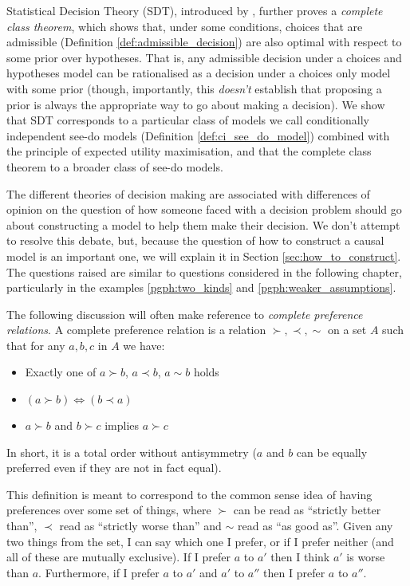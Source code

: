 Statistical Decision Theory (SDT), introduced by \citet{wald_statistical_1950}, further proves a \emph{complete class theorem}, which shows that, under some conditions, choices that are admissible (Definition \ref{def:admissible_decision}) are also optimal with respect to some prior over hypotheses. That is, any admissible decision under a choices and hypotheses model can be rationalised as a decision under a choices only model with some prior (though, importantly, this \emph{doesn't} establish that proposing a prior is always the appropriate way to go about making a decision). We show that SDT corresponds to a particular class of models we call conditionally independent see-do models (Definition \ref{def:ci_see_do_model}) combined with the principle of expected utility maximisation, and that the complete class theorem to a broader class of see-do models.

The different theories of decision making are associated with differences of opinion on the question of how someone faced with a decision problem should go about constructing a model to help them make their decision. We don't attempt to resolve this debate, but, because the question of how to construct a causal model is an important one, we will explain it in Section \ref{sec:how_to_construct}. The questions raised are similar to questions considered in the following chapter, particularly in the examples \ref{pgph:two_kinds} and \ref{pgph:weaker_assumptions}.

The following discussion will often make reference to \emph{complete preference relations}. A complete preference relation is a relation $\succ,\prec,\sim$ on a set $A$ such that for any $a,b,c$ in $A$ we have:
\begin{itemize}
    \item Exactly one of $a\succ b$, $a\prec b$, $a\sim b$ holds
    \item $(a\succ b)\iff(b\prec a)$
    \item $a\succ b$ and $b\succ c$ implies $a\succ c$
\end{itemize}
In short, it is a total order without antisymmetry ($a$ and $b$ can be equally preferred even if they are not in fact equal).

This definition is meant to correspond to the common sense idea of having preferences over some set of things, where $\succ$ can be read as ``strictly better than'', $\prec$ read as ``strictly worse than'' and $\sim$ read as ``as good as''. Given any two things from the set, I can say which one I prefer, or if I prefer neither (and all of these are mutually exclusive). If I prefer $a$ to $a'$ then I think $a'$ is worse than $a$. Furthermore, if I prefer $a$ to $a'$ and $a'$ to $a''$ then I prefer $a$ to $a''$.

